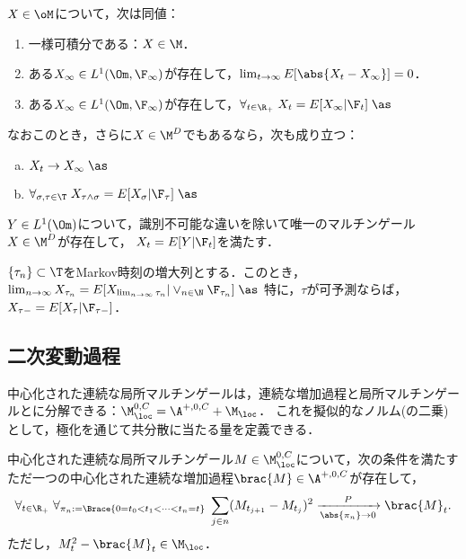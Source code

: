 \documentclass[uplatex,dvipdfmx]{jsreport}
\begin{document}
\begin{theorem}[マルチンゲールが一様可積分であることの特徴付け]
    $X\in\oM$について，次は同値：
    \begin{enumerate}
        \item 一様可積分である：$X\in\M$．
        \item ある$X_\infty\in L^1(\Om,\F_\infty)$が存在して，$\lim_{t\to\infty}E[\abs{X_t-X_\infty}]=0$．
        \item ある$X_\infty\in L^1(\Om,\F_\infty)$が存在して，$\forall_{t\in\R_+}\;X_t=E[X_\infty|\F_t]\;\as$
    \end{enumerate}
    なおこのとき，さらに$X\in\M^D$でもあるなら，次も成り立つ：
    \begin{enumerate}[(a)]
        \item $X_t\to X_\infty\;\as$
        \item $\forall_{\sigma,\tau\in\T}\;X_{\tau\land\sigma}=E[X_\sigma|\F_\tau]\;\as$
    \end{enumerate}
\end{theorem}

\begin{theorem}
    $Y\in L^1(\Om)$について，識別不可能な違いを除いて唯一のマルチンゲール$X\in\M^D$が存在して，
    $X_t=E[Y|\F_t]$を満たす．
\end{theorem}

\begin{theorem}
    $\{\tau_n\}\subset\T$をMarkov時刻の増大列とする．このとき，$\lim_{n\to\infty}X_{\tau_n}=E[X_{\lim_{n\to\infty}\tau_n}|\lor_{n\in\N}\F_{\tau_n}]\;\as$
    特に，$\tau$が可予測ならば，$X_{\tau-}=E[X_\tau|\F_{\tau-}]$．
\end{theorem}

\subsection{二次変動過程}

\begin{tcolorbox}[colframe=ForestGreen, colback=ForestGreen!10!white,breakable,colbacktitle=ForestGreen!40!white,coltitle=black,fonttitle=\bfseries\sffamily,
title=]
    中心化された連続な局所マルチンゲールは，連続な増加過程と局所マルチンゲールとに分解できる：$\M^{0,C}_\loc=\A^{+,0,C}+\M_\loc$．
    これを擬似的なノルム(の二乗)として，極化を通じて共分散に当たる量を定義できる．
\end{tcolorbox}

\begin{theorem}
    中心化された連続な局所マルチンゲール$M\in\M^{0,C}_\loc$について，次の条件を満たすただ一つの中心化された連続な増加過程$\brac{M}\in\A^{+,0,C}$が存在して，
    \[\forall_{t\in\R_+}\;\forall_{\pi_n:=\Brace{0=t_0<t_1<\cdots<t_n=t}}\;\sum_{j\in n}(M_{t_{j+1}}-M_{t_j})^2\xrightarrow[\abs{\pi_n}\to0]{P}\brac{M}_t.\]
    ただし，$M^2_t-\brac{M}_t\in\M_\loc$．
\end{theorem}
\end{document}
